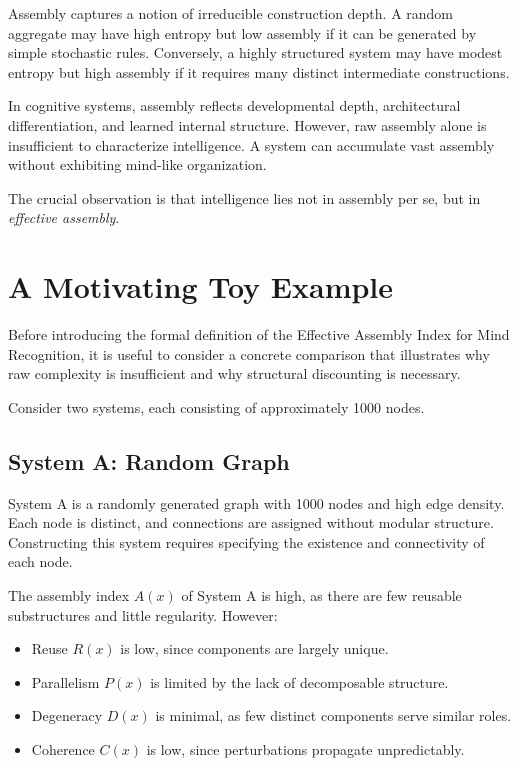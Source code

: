 \documentclass[11pt,letterpaper]{article}
\begin{document}
Assembly captures a notion of irreducible construction depth. A random aggregate may have high entropy but low assembly if it can be generated by simple stochastic rules. Conversely, a highly structured system may have modest entropy but high assembly if it requires many distinct intermediate constructions.

In cognitive systems, assembly reflects developmental depth, architectural differentiation, and learned internal structure. However, raw assembly alone is insufficient to characterize intelligence. A system can accumulate vast assembly without exhibiting mind-like organization.

The crucial observation is that intelligence lies not in assembly per se, but in \emph{effective assembly}.

\section{A Motivating Toy Example}

Before introducing the formal definition of the Effective Assembly Index for Mind Recognition, it is useful to consider a concrete comparison that illustrates why raw complexity is insufficient and why structural discounting is necessary.

Consider two systems, each consisting of approximately 1000 nodes.

\subsection{System A: Random Graph}

System A is a randomly generated graph with 1000 nodes and high edge density. Each node is distinct, and connections are assigned without modular structure. Constructing this system requires specifying the existence and connectivity of each node.

The assembly index $A(x)$ of System A is high, as there are few reusable substructures and little regularity. However:
\begin{itemize}
  \item Reuse $R(x)$ is low, since components are largely unique.
  \item Parallelism $P(x)$ is limited by the lack of decomposable structure.
  \item Degeneracy $D(x)$ is minimal, as few distinct components serve similar roles.
  \item Coherence $C(x)$ is low, since perturbations propagate unpredictably.
\end{itemize}
\end{document}
